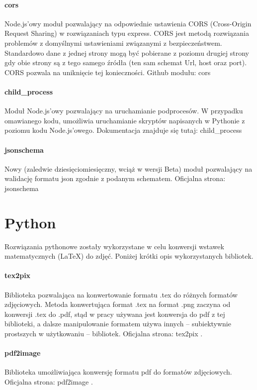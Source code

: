 \paragraph{cors}
Node.js'owy moduł pozwalający na odpowiednie ustawienia CORS (Cross-Origin Request Sharing) w rozwiązaniach typu express. CORS jest metodą rozwiązania problemów z domyślnymi ustawieniami związanymi z bezpieczeństwem. Standardowo dane z jednej strony mogą być pobierane z poziomu drugiej strony gdy obie strony są z tego samego źródła (ten sam schemat Url, host oraz port). CORS pozwala na uniknięcie tej konieczności.
\ind Github modułu: cors \cite{cors}
\paragraph{child\_process}
Moduł Node.js'owy pozwalający na uruchamianie podprocesów. W przypadku omawianego kodu, umożliwia uruchamianie skryptów napisanych  w Pythonie z poziomu kodu Node.js'owego.
\ind Dokumentacja znajduje się tutaj: child\_process \cite{childprocess}
\paragraph{jsonschema}
\ind Nowy (zaledwie dziesięciomiesięczny, wciąż w wersji Beta) moduł pozwalający na walidację formatu json zgodnie z podanym schematem.
\ind Oficjalna strona: jsonschema \cite{jsonschema}

\section{Python}
Rozwiązania pythonowe zostały wykorzystane w celu konwersji wstawek matematycznych (\LaTeX{}) do zdjęć. Poniżej krótki opis wykorzystanych bibliotek.
\paragraph{tex2pix} Biblioteka pozwalająca na konwertowanie formatu .tex do różnych formatów zdjęciowych. Metoda konwertująca format .tex na format .png zaczyna od konwersji .tex do .pdf, stąd w pracy używana jest konwersja do pdf z tej biblioteki, a dalsze manipulowanie formatem używa innych -- subiektywnie prostszych w użytkowaniu -- bibliotek. 
\ind Oficjalna strona: tex2pix \cite{tex2pix}.

\paragraph{pdf2image} Biblioteka  umożliwiająca konwersję formatu pdf do formatów zdjęciowych.
\ind Oficjalna strona: pdf2image \cite{pdf2image}.
